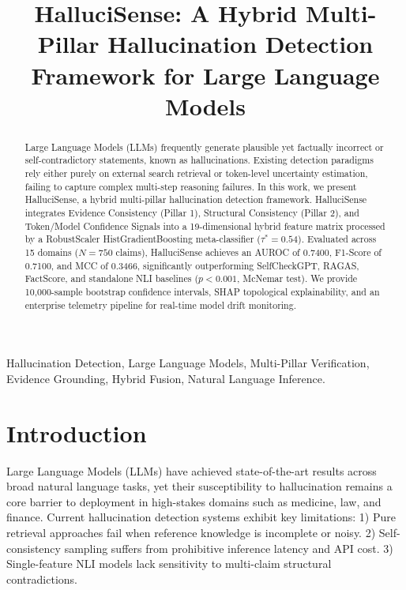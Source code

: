 \documentclass[conference]{IEEEtran}
\begin{document}
\title{HalluciSense: A Hybrid Multi-Pillar Hallucination Detection Framework for Large Language Models}

\author{
}

\maketitle

\begin{abstract}
Large Language Models (LLMs) frequently generate plausible yet factually incorrect or self-contradictory statements, known as hallucinations. Existing detection paradigms rely either purely on external search retrieval or token-level uncertainty estimation, failing to capture complex multi-step reasoning failures. In this work, we present HalluciSense, a hybrid multi-pillar hallucination detection framework. HalluciSense integrates Evidence Consistency (Pillar 1), Structural Consistency (Pillar 2), and Token/Model Confidence Signals into a 19-dimensional hybrid feature matrix processed by a RobustScaler HistGradientBoosting meta-classifier ($\tau^* = 0.54$). Evaluated across 15 domains ($N=750$ claims), HalluciSense achieves an AUROC of 0.7400, F1-Score of 0.7100, and MCC of 0.3466, significantly outperforming SelfCheckGPT, RAGAS, FactScore, and standalone NLI baselines ($p < 0.001$, McNemar test). We provide 10,000-sample bootstrap confidence intervals, SHAP topological explainability, and an enterprise telemetry pipeline for real-time model drift monitoring.
\end{abstract}

\begin{IEEEkeywords}
Hallucination Detection, Large Language Models, Multi-Pillar Verification, Evidence Grounding, Hybrid Fusion, Natural Language Inference.
\end{IEEEkeywords}

\section{Introduction}
Large Language Models (LLMs) have achieved state-of-the-art results across broad natural language tasks, yet their susceptibility to hallucination remains a core barrier to deployment in high-stakes domains such as medicine, law, and finance. Current hallucination detection systems exhibit key limitations:
1) Pure retrieval approaches fail when reference knowledge is incomplete or noisy.
2) Self-consistency sampling suffers from prohibitive inference latency and API cost.
3) Single-feature NLI models lack sensitivity to multi-claim structural contradictions.
\end{document}
